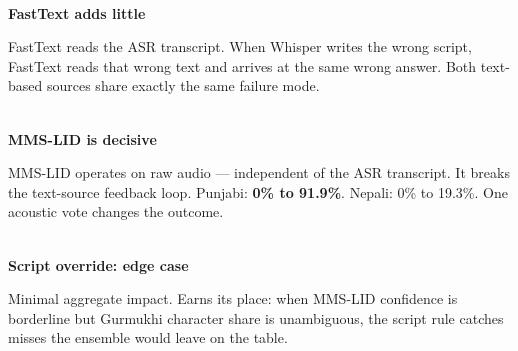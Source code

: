 \documentclass[11pt,a4paper]{article}
\begin{document}
\noindent
\begin{minipage}[t]{0.32\textwidth}
\begin{tcolorbox}[enhanced,colback=LRed,colframe=DRed,arc=5pt,boxrule=1.5pt,
  left=6pt,right=6pt,top=6pt,bottom=6pt]
\\
{\small\bfseries FastText adds little}\\[4pt]
\small\raggedright FastText reads the ASR transcript. When Whisper writes the wrong script, FastText reads that wrong text and arrives at the same wrong answer. Both text-based sources share exactly the same failure mode.
\end{tcolorbox}
\end{minipage}\hfill
\begin{minipage}[t]{0.32\textwidth}
\begin{tcolorbox}[enhanced,colback=LGreen,colframe=DGreen,arc=5pt,boxrule=1.5pt,
  left=6pt,right=6pt,top=6pt,bottom=6pt]
\\
{\small\bfseries MMS-LID is decisive}\\[4pt]
\small\raggedright MMS-LID operates on raw audio --- independent of the ASR transcript. It breaks the text-source feedback loop. Punjabi: \textbf{0\% to 91.9\%}. Nepali: 0\% to 19.3\%. One acoustic vote changes the outcome.
\end{tcolorbox}
\end{minipage}\hfill
\begin{minipage}[t]{0.32\textwidth}
\begin{tcolorbox}[enhanced,colback=SkyBg,colframe=Royal,arc=5pt,boxrule=1.5pt,
  left=6pt,right=6pt,top=6pt,bottom=6pt]
\\
{\small\bfseries Script override: edge case}\\[4pt]
\small\raggedright Minimal aggregate impact. Earns its place: when MMS-LID confidence is borderline but Gurmukhi character share is unambiguous, the script rule catches misses the ensemble would leave on the table.
\end{tcolorbox}
\end{minipage}

\vspace{5pt}
\end{document}
